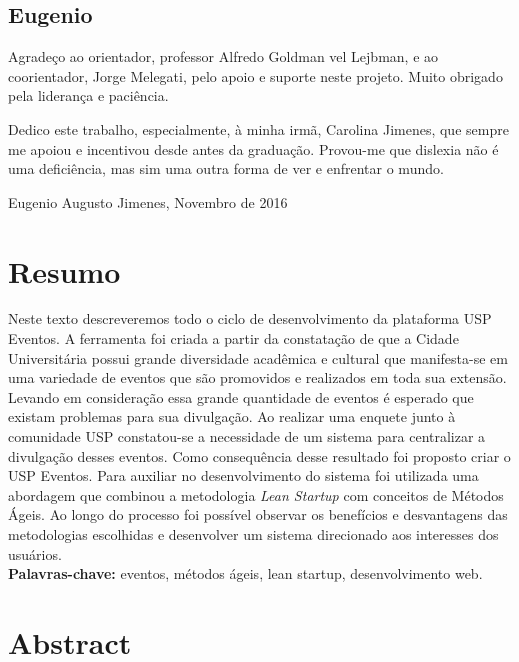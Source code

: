 \documentclass[12pt,twoside,a4paper]{book}
\begin{document}
\section{Eugenio}
\par Agradeço ao orientador, professor Alfredo Goldman vel Lejbman, e ao coorientador, Jorge Melegati, pelo apoio e suporte neste projeto. Muito obrigado pela liderança e paciência.
\par Dedico este trabalho, especialmente, à minha irmã, Carolina Jimenes, que sempre me apoiou e incentivou desde antes da graduação. Provou-me que dislexia não é uma deficiência, mas sim uma outra forma de ver e enfrentar o mundo.
\begin{flushright}
Eugenio Augusto Jimenes, Novembro de 2016
\end{flushright}



\chapter*{Resumo}
    \par Neste texto descreveremos todo o ciclo de desenvolvimento da plataforma USP Eventos. A ferramenta foi criada a partir da constatação de que a Cidade Universitária possui grande diversidade acadêmica e cultural que manifesta-se em uma variedade de eventos que são promovidos e realizados em toda sua extensão. Levando em consideração essa grande quantidade de eventos é esperado que existam problemas para sua divulgação. Ao realizar uma enquete junto à comunidade USP constatou-se a necessidade de um sistema para centralizar a divulgação desses eventos. Como consequência desse resultado foi proposto criar o USP Eventos. Para auxiliar no desenvolvimento do sistema foi utilizada uma abordagem que combinou a metodologia \emph{Lean Startup} com conceitos de Métodos Ágeis. Ao longo do processo foi possível observar os benefícios e desvantagens das metodologias escolhidas e desenvolver um sistema direcionado aos interesses dos usuários.
\\

\noindent \textbf{Palavras-chave:} eventos, métodos ágeis, lean startup, desenvolvimento web.

\chapter*{Abstract}
\end{document}
